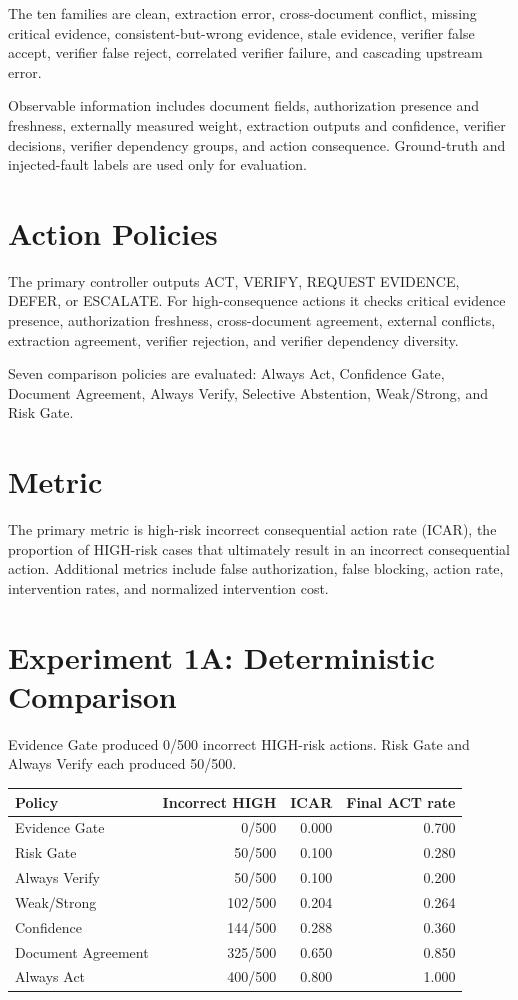 \documentclass[11pt]{article}
\begin{document}
The ten families are clean, extraction error, cross-document conflict, missing critical evidence, consistent-but-wrong evidence, stale evidence, verifier false accept, verifier false reject, correlated verifier failure, and cascading upstream error.

Observable information includes document fields, authorization presence and freshness, externally measured weight, extraction outputs and confidence, verifier decisions, verifier dependency groups, and action consequence. Ground-truth and injected-fault labels are used only for evaluation.

\section{Action Policies}
The primary controller outputs ACT, VERIFY, REQUEST EVIDENCE, DEFER, or ESCALATE. For high-consequence actions it checks critical evidence presence, authorization freshness, cross-document agreement, external conflicts, extraction agreement, verifier rejection, and verifier dependency diversity.

Seven comparison policies are evaluated: Always Act, Confidence Gate, Document Agreement, Always Verify, Selective Abstention, Weak/Strong, and Risk Gate.

\section{Metric}
The primary metric is high-risk incorrect consequential action rate (ICAR), the proportion of HIGH-risk cases that ultimately result in an incorrect consequential action. Additional metrics include false authorization, false blocking, action rate, intervention rates, and normalized intervention cost.

\section{Experiment 1A: Deterministic Comparison}
Evidence Gate produced 0/500 incorrect HIGH-risk actions. Risk Gate and Always Verify each produced 50/500.

\begin{table}[h]
\centering
\begin{tabular}{lrrr}
\toprule
Policy & Incorrect HIGH & ICAR & Final ACT rate\\
\midrule
Evidence Gate & 0/500 & 0.000 & 0.700\\
Risk Gate & 50/500 & 0.100 & 0.280\\
Always Verify & 50/500 & 0.100 & 0.200\\
Weak/Strong & 102/500 & 0.204 & 0.264\\
Confidence & 144/500 & 0.288 & 0.360\\
Document Agreement & 325/500 & 0.650 & 0.850\\
Always Act & 400/500 & 0.800 & 1.000\\
\bottomrule
\end{tabular}
\end{table}
\end{document}
